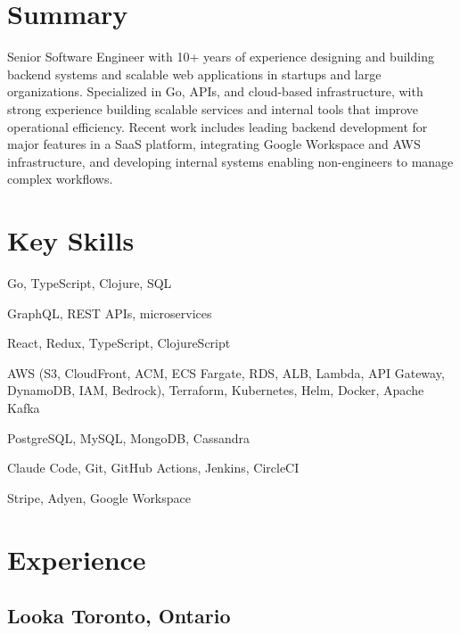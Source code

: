\documentclass[10pt]{article}
\begin{document}


\section{Summary}
Senior Software Engineer with 10+ years of experience designing and building backend systems and scalable web applications in startups and large organizations. Specialized in Go, APIs, and cloud-based infrastructure, with strong experience building scalable services and internal tools that improve operational efficiency. Recent work includes leading backend development for major features in a SaaS platform, integrating Google Workspace and AWS infrastructure, and developing internal systems enabling non-engineers to manage complex workflows.

\section{Key Skills}
\begin{description}[itemsep=0pt]
  \item[Languages] Go, TypeScript, Clojure, SQL
  \item[Backend] GraphQL, REST APIs, microservices
  \item[Frontend] React, Redux, TypeScript, ClojureScript
  \item[Infrastructure] AWS (S3, CloudFront, ACM, ECS Fargate, RDS, ALB, Lambda, API Gateway, DynamoDB, IAM, Bedrock), Terraform, Kubernetes, Helm, Docker, Apache Kafka
  \item[Databases] PostgreSQL, MySQL, MongoDB, Cassandra
  \item[Tools] Claude Code, Git, GitHub Actions, Jenkins, CircleCI
  \item[Integrations] Stripe, Adyen, Google Workspace
\end{description}

\section{Experience}

\subsection{Looka \hfill Toronto, Ontario}
\end{document}
